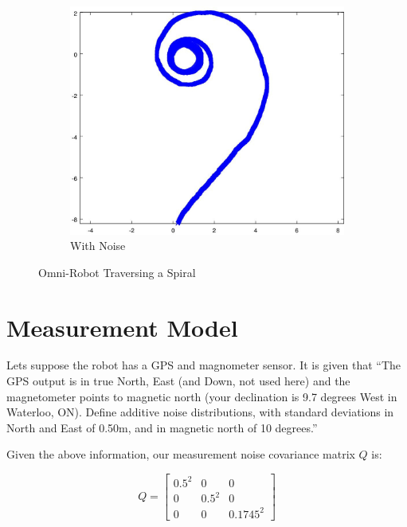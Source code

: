\documentclass{article}
\begin{document}
\begin{figure}[H]
	\begin{subfigure}[b]{0.45\linewidth}
		\includegraphics[width=\textwidth]{images/traverse_spiral_with_noise.jpg}
		\caption{With Noise}
	\end{subfigure}
	\caption{Omni-Robot Traversing a Spiral}
	\label{fig:omni_robot_spiral}
\end{figure}






\newpage
\section{Measurement Model}
\label{sec:measurement_model}

Lets suppose the robot has a GPS and magnometer sensor. It is given that ``The
GPS output is in true North, East (and Down, not used here) and the
magnetometer points to magnetic north (your declination is 9.7 degrees West in
Waterloo, ON). Define additive noise distributions, with standard deviations in
North and East of 0.50m, and in magnetic north of 10 degrees.''

Given the above information, our measurement noise covariance matrix $Q$ is:

\begin{equation}
	Q = 
	\begin{bmatrix}
		0.5^{2} & 0 & 0 \\
		0 & 0.5^{2} & 0 \\
		0 & 0 & 0.1745^{2}		
	\end{bmatrix}
\end{equation}
\end{document}

